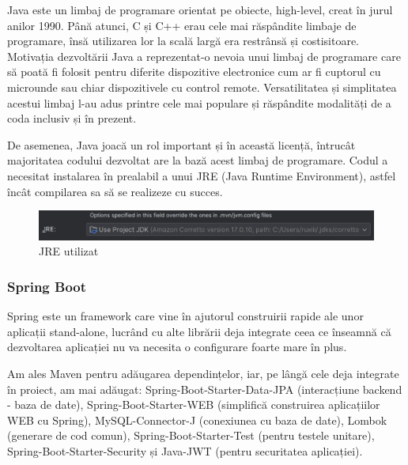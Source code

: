 \hspace{0cm} Java este un limbaj de programare orientat pe obiecte, high-level, creat în jurul anilor 1990. Până atunci, C și C++ erau cele mai răspândite limbaje de programare, însă utilizarea lor la scală largă era restrânsă și costisitoare. Motivația dezvoltării Java a reprezentat-o nevoia unui limbaj de programare care să poată fi folosit pentru diferite dispozitive electronice cum ar fi cuptorul cu microunde sau chiar dispozitivele cu control remote.\cite{citation3} Versatilitatea și simplitatea acestui limbaj l-au adus printre cele mai populare și răspândite modalități de a coda inclusiv și în prezent. 

De asemenea, Java joacă un rol important și în această licență, întrucât majoritatea codului dezvoltat are la bază acest limbaj de programare. Codul a necesitat instalarea în prealabil a unui JRE (Java Runtime Environment), astfel încât compilarea sa să se realizeze cu succes.

\begin{figure}[!htb]
    \centering
    \includegraphics[width=0.9\linewidth]{images/JRE.png}
    \caption{JRE utilizat}
    \label{fig:JRE}
\end{figure}

\vspace{0.5em}
    
\begin{minipage}{\textwidth}
\hfill
\begin{minipage}{0.9\textwidth}
\subsubsection{Spring Boot}
\end{minipage}
\end{minipage}

\hspace{0cm}Spring este un framework care vine în ajutorul construirii rapide ale unor aplicații stand-alone, lucrând cu alte librării deja integrate ceea ce înseamnă că dezvoltarea aplicației nu va necesita o  configurare foarte mare în plus.\cite{citation4}

Am ales Maven pentru adăugarea dependințelor, iar, pe lângă cele deja integrate în proiect, am mai adăugat: Spring-Boot-Starter-Data-JPA (interacțiune backend - baza de date), Spring-Boot-Starter-WEB (simplifică construirea aplicațiilor WEB cu Spring), MySQL-Connector-J (conexiunea cu baza de date), Lombok (generare de cod comun), Spring-Boot-Starter-Test (pentru testele unitare), Spring-Boot-Starter-Security și Java-JWT (pentru securitatea aplicației).

